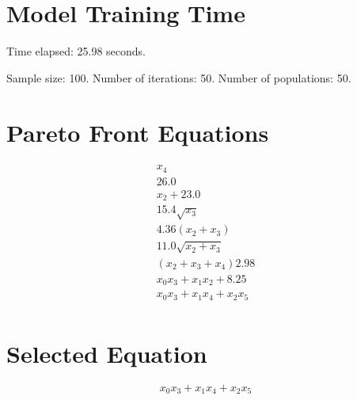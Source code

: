 \documentclass{article}
\begin{document}
\section*{Model Training Time}
Time elapsed: 25.98 seconds.

Sample size: 100.
Number of iterations: 50.
Number of populations: 50.

\section*{Pareto Front Equations}
\begin{align*}
x_{4} \\
26.0 \\
x_{2} + 23.0 \\
15.4 \sqrt{x_{3}} \\
4.36 \left(x_{2} + x_{3}\right) \\
11.0 \sqrt{x_{2} + x_{3}} \\
\left(x_{2} + x_{3} + x_{4}\right) 2.98 \\
x_{0} x_{3} + x_{1} x_{2} + 8.25 \\
x_{0} x_{3} + x_{1} x_{4} + x_{2} x_{5} \\
\end{align*}

\section*{Selected Equation}
\[ x_{0} x_{3} + x_{1} x_{4} + x_{2} x_{5} \]
\end{document}
